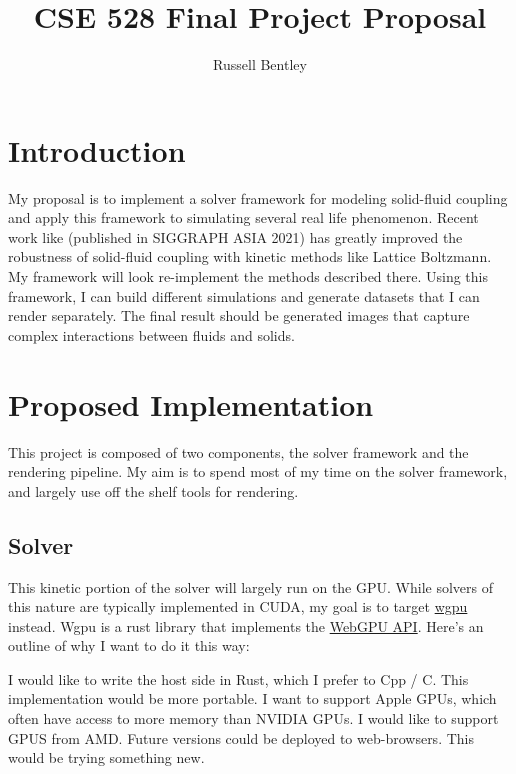 \documentclass{article}
\title{CSE 528 Final Project Proposal}
\author{Russell Bentley}
\begin{document}
\maketitle

\section{Introduction}
My proposal is to implement a solver framework for modeling 
solid-fluid coupling and apply this framework to simulating several
real life phenomenon.
Recent work like \cite{Lyu2021} (published in SIGGRAPH ASIA 2021)
has greatly improved the robustness of solid-fluid coupling
with kinetic methods like Lattice Boltzmann.
My framework will look re-implement the methods described there.
Using this framework, I can build different simulations
and generate datasets that I can render separately.
The final result should be generated images
that capture complex interactions between fluids and solids.

\section{Proposed Implementation}

This project is composed of two components, 
the solver framework and the rendering pipeline.
My aim is to spend most of my time on the solver framework,
and largely use off the shelf tools for 
rendering.

\subsection{Solver}


This kinetic portion of the solver will largely run on the GPU.
While solvers of this nature are typically implemented in CUDA,
my goal is to target \href{https://wgpu.rs}{wgpu} instead.
Wgpu is a rust library that implements the \href{https://developer.mozilla.org/en-US/docs/Web/API/WebGPU_API}{WebGPU API}.
Here's an outline of why I want to do it this way:
\begin{outline}
  \1 I would like to write the host side in Rust, which I prefer to Cpp / C.
  \1 This implementation would be more portable.
    \2 I want to support Apple GPUs, which often have access to more memory than NVIDIA GPUs.
    \2 I would like to support GPUS from AMD.
    \2 Future versions could be deployed to web-browsers.
  \1 This would be trying something new.
\end{outline}
\end{document}
